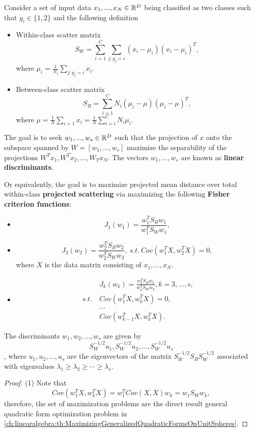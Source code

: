 \begin{refsection}
\begin{definition}\label{ch:statistical-learning:ch:statistical-learning:th:OptimalityConditionFisherCriterionMultiDimensional}\cite[654]{johnson2007applied}
	Consider a set of input data $x_1,...,x_N\in \mathbb{R}^D$ being classified as two classes such that $y_i\in \{1,2\}$ and the following definition	
	\begin{itemize}
		\item Within-class scatter matrix
		$$S_W = \sum_{i=1}^C \sum_{j:y_j = i} (x_i - \mu_i)(x_i - \mu_i)^T,$$
		where $\mu_i = \frac{1}{N_i}\sum_{j:y_j = i} x_i$.
		\item Between-class scatter matrix
		$$S_B = \sum_{i=1}^C N_i(\mu_i - \mu)(\mu_i - \mu)^T,$$
		where $\mu = \frac{1}{N}\sum_{i=1} x_i = \frac{1}{N}\sum_{i = i}^C N_i\mu_i$.
	\end{itemize}
	
	
	The goal is to seek $w_1,...,w_s\in \mathbb{R}^D$ such that the projection of $x$ onto the subspace spanned by $W=[w_1,...,w_s]$ maximize the separability of the projections $W^Tx_1, W^Tx_2,..., W_Tx_N$. The vectors $w_1,...,w_s$ are known as \textbf{linear discriminants}. 
	
	Or equivalently, the goal is to maximize projected mean distance over total within-class \textbf{projected scattering} via maximizing the following \textbf{Fisher criterion functions}:
	\begin{itemize}
		\item $$J_1(w_1) =\frac{w^T_1S_Bw_1}{w^T_1S_Ww_1},$$
		\item $$J_2(w_2) =\frac{w^T_2S_Bw_2}{w^T_2S_Ww_2}, ~s.t.~ Cov(w_1^TX,w_2^TX) = 0 ,$$
		where $X$ is the data matrix consisting of $x_1,...,x_N$.
		\item
		\begin{align*}
		& J_k(w_k) =\frac{w^T_kS_Bw_k}{w^T_kS_Ww_k},k=3,...,s,\\ 
		~s.t.~ & Cov(w_1^TX,w_k^TX) = 0,\\
		& ... \\
		& Cov(w_{k-1}^TX,w_k^TX). 
		\end{align*}
	\end{itemize}
\end{definition}

\begin{theorem}
	The discriminants $w_1,w_2,...,w_s$	are given by $$S_W^{-1/2}u_1,S_W^{-1/2}u_2,...,S_W^{-1/2}u_s$$, where $u_1,u_2,...,u_s$ are the eigenvectors of the matrix $S_W^{-1/2}S_BS_W^{-1/2}$ associated with eigenvalues $\lambda_1\geq \lambda_2 \geq \cdots \geq \lambda_s$.
\end{theorem}
\begin{proof}
	(1) Note that $$Cov(w_1^TX,w_k^TX) = w_1^TCov(X,X)w_k = w_1S_Ww_k,$$
	therefore, the set of maximization problems are the direct result general quadratic form optimization problem in \autoref{ch:linearalgebra:th:MaximizingGeneralizedQuadraticFormsOnUnitSpheres}.
\end{proof}



\end{refsection}
